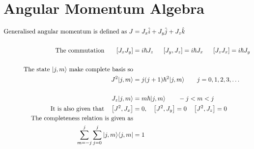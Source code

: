 \section{Angular Momentum Algebra}
\begin{align*}
\text{Generalised angular momentum is defined as }J&=J_{x} \hat{i}+J_{y} \hat{j}+J_{z} \hat{k}\\\\
\text{The commutation \hspace{0.5cm}}\left[J_{x} J_{y}\right]&=i \hbar J_{z} \hspace{0.5cm} \left[J_{y}, J_{z}\right]=i \hbar J_{x}\hspace{0.5cm}\left[J_{z} J_{x}\right]=i \hbar J_{y}\\\\
\text{The state $|j, m\rangle$ make complete basis so}&\\
J^{2}|j, m\rangle&=j(j+1) \hbar^{2}|j, m\rangle \qquad j=0,1,2,3, \ldots \\\\
J_{z}|j, m\rangle&=m \hbar|j, m\rangle \qquad -j<m<j\\
\text{It is also given that}\quad\left[J^{2}, J_{x}\right]&=0,\quad \left[J^{2}, J_{y}\right]=0 \quad\left[J^{2}, J_{z}\right]=0\\
\text{The completeness relation is given as}\\
\sum_{m=-j}^{j} \sum_{j=0}^{j}|j, m\rangle\langle j, m|&=1
\end{align*}

